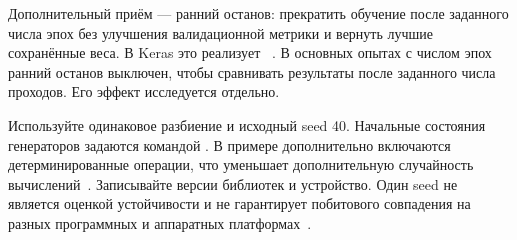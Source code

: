 Дополнительный приём --- ранний останов: прекратить обучение после
заданного числа эпох без улучшения валидационной метрики и вернуть
лучшие сохранённые веса. В Keras это реализует
~\cite{early}. В основных опытах с числом эпох
ранний останов выключен, чтобы сравнивать результаты после заданного
числа проходов. Его эффект исследуется отдельно.

Используйте одинаковое разбиение и исходный seed 40.
Начальные состояния генераторов задаются командой
.
В примере дополнительно включаются детерминированные операции, что уменьшает
дополнительную случайность вычислений~\cite{seed}.
Записывайте версии библиотек и устройство. Один seed не является
оценкой устойчивости и не гарантирует побитового совпадения на разных
программных и аппаратных платформах~\cite{determinism}.
